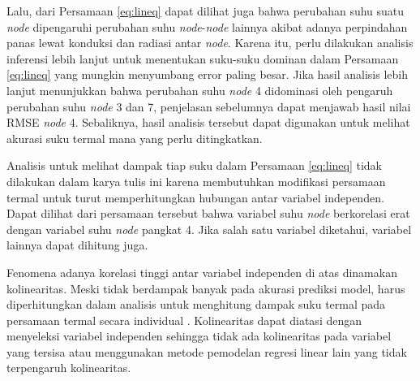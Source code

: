 Lalu, dari Persamaan \ref{eq:lineq} dapat dilihat juga bahwa perubahan suhu
suatu \textit{node} dipengaruhi perubahan suhu \textit{node}-\textit{node} lainnya akibat adanya
perpindahan panas lewat konduksi dan radiasi antar \textit{node}. Karena itu, perlu
dilakukan analisis inferensi lebih lanjut untuk menentukan suku-suku dominan
dalam Persamaan \ref{eq:lineq} yang mungkin menyumbang error paling besar. Jika
hasil analisis lebih lanjut menunjukkan bahwa perubahan suhu \textit{node} 4 didominasi
oleh pengaruh perubahan suhu \textit{node} 3 dan 7, penjelasan sebelumnya dapat menjawab
hasil nilai RMSE \textit{node} 4. Sebaliknya, hasil analisis tersebut dapat digunakan
untuk melihat akurasi suku termal mana yang perlu ditingkatkan.

Analisis untuk melihat dampak tiap suku dalam Persamaan \ref{eq:lineq} tidak
dilakukan dalam karya tulis ini karena membutuhkan modifikasi persamaan termal
untuk turut memperhitungkan hubungan antar variabel independen. Dapat dilihat
dari persamaan tersebut bahwa variabel suhu \textit{node} berkorelasi erat dengan
variabel suhu \textit{node} pangkat 4. Jika salah satu variabel diketahui, variabel
lainnya dapat dihitung juga. 

Fenomena adanya korelasi tinggi antar variabel independen di atas dinamakan
kolinearitas. Meski tidak berdampak banyak pada akurasi prediksi model,
harus diperhitungkan dalam analisis untuk menghitung dampak suku termal pada
persamaan termal secara individual \cite{lieberman2014}\cite{mundfrom2018}.
Kolinearitas dapat diatasi dengan menyeleksi variabel independen sehingga tidak
ada kolinearitas pada variabel yang tersisa atau menggunakan metode pemodelan
regresi linear lain yang tidak terpengaruh kolinearitas.


